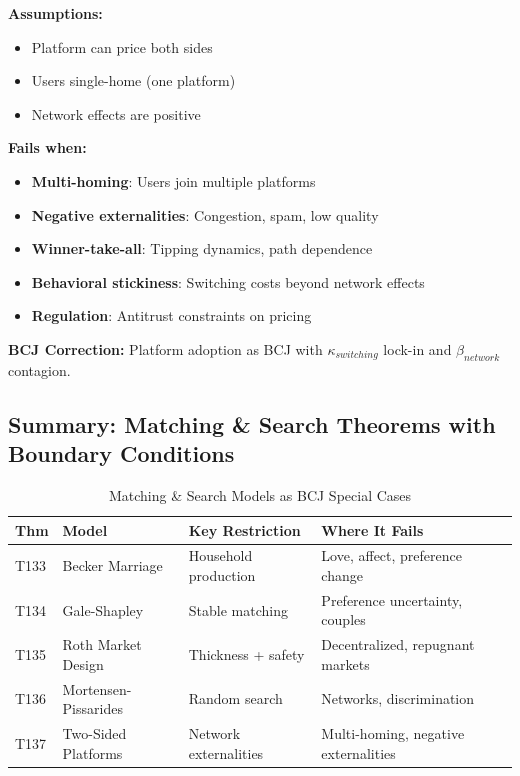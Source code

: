 \begin{tcolorbox}[colback=red!5!white, colframe=red!75!black, title=Boundary Condition: Where Two-Sided Platform Theory Fails]
\textbf{Assumptions:}
\begin{itemize}[nosep]
\item Platform can price both sides
\item Users single-home (one platform)
\item Network effects are positive
\end{itemize}

\textbf{Fails when:}
\begin{itemize}[nosep]
\item \textbf{Multi-homing}: Users join multiple platforms
\item \textbf{Negative externalities}: Congestion, spam, low quality
\item \textbf{Winner-take-all}: Tipping dynamics, path dependence
\item \textbf{Behavioral stickiness}: Switching costs beyond network effects
\item \textbf{Regulation}: Antitrust constraints on pricing
\end{itemize}

\textbf{BCJ Correction:} Platform adoption as BCJ with $\kappa_{switching}$ lock-in and $\beta_{network}$ contagion.
\end{tcolorbox}

\subsection{Summary: Matching \& Search Theorems with Boundary Conditions}

\begin{table}[htbp]
\centering
\caption{Matching \& Search Models as BCJ Special Cases}
\label{tab:matching-boundaries}
\renewcommand{\arraystretch}{1.2}
\begin{tabular}{@{}llp{3.5cm}p{4cm}@{}}
\toprule
\textbf{Thm} & \textbf{Model} & \textbf{Key Restriction} & \textbf{Where It Fails} \\
\midrule
T133 & Becker Marriage & Household production & Love, affect, preference change \\
T134 & Gale-Shapley & Stable matching & Preference uncertainty, couples \\
T135 & Roth Market Design & Thickness + safety & Decentralized, repugnant markets \\
T136 & Mortensen-Pissarides & Random search & Networks, discrimination \\
T137 & Two-Sided Platforms & Network externalities & Multi-homing, negative externalities \\
\bottomrule
\end{tabular}
\end{table}


